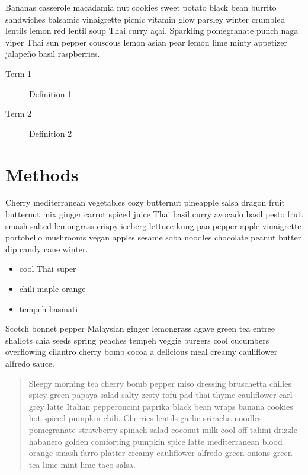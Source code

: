 \documentclass{book}
\providecommand{\tightlist}{%
  \setlength{\itemsep}{0pt}\setlength{\parskip}{0pt}}
\begin{document}
Bananas casserole macadamia nut cookies sweet potato black bean burrito
sandwiches balsamic vinaigrette picnic vitamin glow parsley winter crumbled
lentils lemon red lentil soup Thai curry açai. Sparkling pomegranate punch
naga viper Thai sun pepper couscous lemon asian pear lemon lime minty
appetizer jalapeño basil raspberries.

\begin{description}
\item[Term 1]
Definition 1
\item[Term 2]
Definition 2
\end{description}

\hypertarget{methods}{%
\section{Methods}\label{methods}}

Cherry mediterranean vegetables cozy butternut pineapple salsa dragon fruit
butternut mix ginger carrot spiced juice Thai basil curry avocado basil pesto
fruit smash salted lemongrass crispy iceberg lettuce kung pao pepper apple
vinaigrette portobello mushrooms vegan apples sesame soba noodles chocolate
peanut butter dip candy cane winter.

\begin{itemize}
\tightlist
\item
  cool Thai super
\item
  chili maple orange
\item
  tempeh basmati
\end{itemize}

Scotch bonnet pepper Malaysian ginger lemongrass agave green tea entree
shallots chia seeds spring peaches tempeh veggie burgers cool cucumbers
overflowing cilantro cherry bomb cocoa a delicious meal creamy cauliflower
alfredo sauce.

\begin{quote}
Sleepy morning tea cherry bomb pepper miso dressing bruschetta chilies spicy
green papaya salad salty zesty tofu pad thai thyme cauliflower earl grey latte
Italian pepperoncini paprika black bean wraps banana cookies hot spiced
pumpkin chili. Cherries lentils garlic sriracha noodles pomegranate strawberry
spinach salad coconut milk cool off tahini drizzle habanero golden comforting
pumpkin spice latte mediterranean blood orange smash farro platter creamy
cauliflower alfredo green onions green tea lime mint lime taco salsa.
\end{quote}
\end{document}
